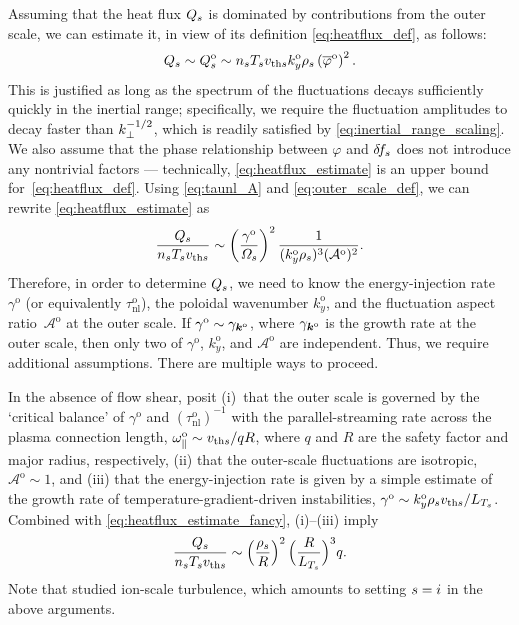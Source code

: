 \documentclass{jpp}
\newcommand{\taunlo}{\tau_\text{nl}^\text{o}}
\newcommand{\phinorm}{\varphi}
\newcommand{\phinormko}{\overline{\phinorm}^\text{o}}
\newcommand{\kyo}{k_y^\text{o}}
\newcommand{\gammao}{\gamma^\text{o}}
\newcommand{\A}{\mathcal{A}}
\newcommand{\Ao}{\A^\text{o}}
\begin{document}
Assuming that the heat flux \(Q_s\) is dominated by contributions from the outer scale, we can estimate it, in view of its definition \cref{eq:heatflux_def}, as follows:
\begin{equation}
	Q_\s \sim Q^\text{o}_\s \sim  n_{\s} T_{\s} \vths \kyo \rho_\s \left(\phinormko\right)^2.
	\label{eq:heatflux_estimate}
\end{equation}
This is justified as long as the spectrum of the fluctuations decays sufficiently quickly in the inertial range; specifically, we require the fluctuation amplitudes to decay faster than $k_\perp^{-1/2}$, which is readily satisfied by \cref{eq:inertial_range_scaling}. We also assume that the phase relationship between \(\phinorm\) and \(\delta \! f_{s}\) does not introduce any nontrivial factors --- technically, \cref{eq:heatflux_estimate} is an upper bound for~\cref{eq:heatflux_def}. Using \cref{eq:taunl_A} and \cref{eq:outer_scale_def}, we can rewrite \cref{eq:heatflux_estimate} as
\begin{equation}
	\frac{Q_\s}{n_{\s} T_{\s} \vths} \sim \left(\frac{\gammao}{\Omega_\s}\right)^2 \frac{1}{(\kyo \rho_\s)^3 (\Ao)^2}.
	\label{eq:heatflux_estimate_fancy}
\end{equation}
Therefore, in order to determine \(Q_s\), we need to know the energy-injection rate \(\gammao\) (or equivalently \(\taunlo\)), the poloidal wavenumber \(\kyo\), and the fluctuation aspect ratio~\(\Ao\) at the outer scale. If \(\gammao\sim\gamma_{\vk^\text{o}}\), where \(\gamma_{{\boldsymbol{k}}^\text{o}}\) is the growth rate at the outer scale, then only two of \(\gammao\), \(\kyo\), and \(\Ao\) are independent. Thus, we require additional assumptions. There are multiple ways to proceed.

In the absence of flow shear, \citet{barnes11} posit (i)~that the outer scale is governed by the `critical balance' of \(\gammao\) and \((\taunlo)^{-1}\) with the parallel-streaming rate across the plasma connection length, \(\omega_\parallel^\text{o} \sim v_{\text{th}s} / qR\), where \(q\) and \(R\) are the safety factor and major radius, respectively, (ii) that the outer-scale fluctuations are isotropic, \(\Ao \sim 1\), and (iii) that the energy-injection rate is given by a simple estimate of the growth rate of temperature-gradient-driven instabilities, \mbox{\(\gammao \sim \kyo \rho_\s \vths/L_{T_\s}\)}. Combined with \cref{eq:heatflux_estimate_fancy}, \mbox{(i)--(iii)} imply
\begin{equation}
	\frac{Q_s}{n_{s} T_{s} v_{\text{th}s}} \sim \left(\frac{\rho_s}{R}\right)^2 \Big(\frac{R}{L_{T_s}}\Big)^3 q.
\end{equation}
Note that \citet{barnes11} studied ion-scale turbulence, which amounts to setting \(s = i\) in the above arguments.
\end{document}
